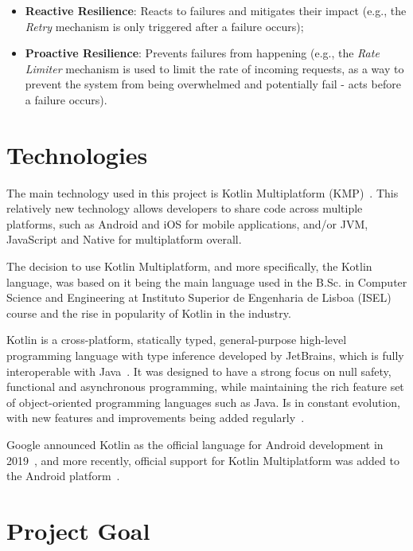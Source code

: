 \begin{itemize}
    \item \textbf{Reactive Resilience}: Reacts to failures and mitigates their impact (e.g., the \textit{Retry} mechanism is only triggered after a failure occurs);
    \item \textbf{Proactive Resilience}: Prevents failures from happening (e.g., the \textit{Rate Limiter} mechanism is used to limit the rate of incoming requests, as a way to prevent the system from being overwhelmed and potentially fail - acts before a failure occurs).
\end{itemize}


\section{Technologies}\label{sec:technologies}

The main technology used in this project is Kotlin Multiplatform (KMP)~\cite{kotlin-multiplatform}.
This relatively new technology allows developers to share code across multiple platforms, such as Android and iOS for mobile applications, and/or JVM, JavaScript and Native for multiplatform overall.

The decision to use Kotlin Multiplatform, and more specifically, the Kotlin language, was based on it being the main language used in the B.Sc. in Computer Science and Engineering at Instituto Superior de Engenharia de Lisboa (ISEL) course and the rise in popularity of Kotlin in the industry.

Kotlin is a cross-platform, statically typed, general-purpose high-level programming language with type inference developed by JetBrains, which is fully interoperable with Java~\cite{wiki:kotlin-programming-language}.
It was designed to have a strong focus on null safety, functional and asynchronous programming, while maintaining the rich feature set of object-oriented programming languages such as Java.
Is in constant evolution, with new features and improvements being added regularly~\cite{kotlin-keep}.

Google announced Kotlin as the official language for Android development in 2019~\cite{wiki:kotlin-programming-language}, and more recently, official support for Kotlin Multiplatform was added to the Android platform~\cite{android-kotlin-multiplatform, google-kotlin-multiplatform}.


\section{Project Goal}\label{sec:project-goal}

